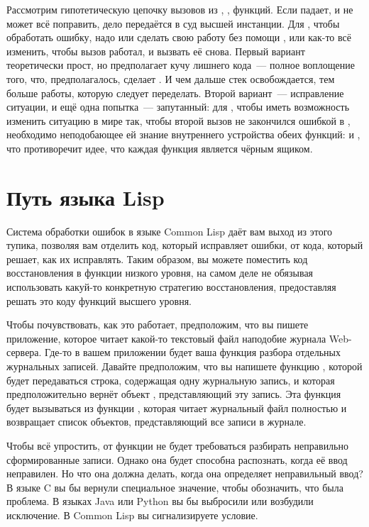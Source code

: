 Рассмотрим гипотетическую цепочку вызовов из , , 
функций. Если  падает, и  не может всё поправить, дело
передаётся в суд высшей инстанции. Для , чтобы обработать ошибку, надо или
сделать свою работу без помощи , или как-то всё изменить, чтобы вызов
 работал, и вызвать её снова. Первый вариант теоретически прост, но
предполагает кучу лишнего кода~--- полное воплощение того, что, предполагалось, сделает
. И чем дальше стек освобождается, тем больше работы, которую следует
переделать. Второй вариант~--- исправление ситуации, и ещё одна попытка~--- запутанный:
для , чтобы иметь возможность изменить ситуацию в мире так, чтобы второй
вызов  не закончился ошибкой в , необходимо неподобающее ей
знание внутреннего устройства обеих функций:  и , что
противоречит идее, что каждая функция является чёрным ящиком.

\section{Путь языка Lisp}

Система обработки ошибок в языке Common Lisp даёт вам выход из этого тупика, позволяя вам
отделить код, который исправляет ошибки, от кода, который решает, как их исправлять. Таким
образом, вы можете поместить код восстановления в функции низкого уровня, на самом деле не
обязывая использовать какуй-то конкретную стратегию восстановления, предоставляя решать
это коду функций высшего уровня.

Чтобы почувствовать, как это работает, предположим, что вы пишете приложение, которое
читает какой-то текстовый файл наподобие журнала Web-сервера. Где-то в вашем приложении
будет ваша функция разбора отдельных журнальных записей. Давайте предположим, что вы
напишете функцию , которой будет передаваться строка, содержащая
одну журнальную запись, и которая предположительно вернёт объект ,
представляющий эту запись. Эта функция будет вызываться из функции ,
которая читает журнальный файл полностью и возвращает список объектов, представляющий все
записи в журнале.

Чтобы всё упростить, от функции  не будет требоваться разбирать
неправильно сформированные записи. Однако она будет способна распознать, когда её ввод
неправилен. Но что она должна делать, когда она определяет неправильный ввод? В языке C вы
бы вернули специальное значение, чтобы обозначить, что была проблема. В языках Java или
Python вы бы выбросили или возбудили исключение. В Common Lisp вы сигнализируете условие.

